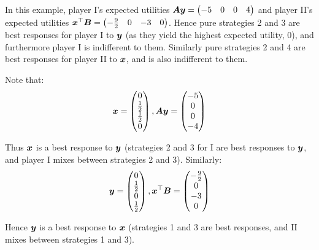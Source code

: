 		In this example, player I's expected utilities $\bm{A} \bm{y}
		= \begin{pmatrix} -5 & 0 & 0 & 4 \end{pmatrix}$ and player II's expected
		utilities $\bm{x}^\top \bm{B} = \begin{pmatrix} -\frac{9}{2} & 0
		& -3 & 0 \end{pmatrix}$. Hence pure strategies 2 and 3
		are best responses for player I to $\bm{y}$ (as they yield the
		highest expected utility, 0), and furthermore player I is indifferent
		to them. Similarly pure strategies 2 and 4 are best responses for
		player II to $\bm{x}$, and is also indifferent to them.

		Note that:
		\begin{equation*}
			\bm{x} =
			\begin{pmatrix}
				0 \\
				\frac{1}{2} \\
				\frac{1}{2} \\
				0
			\end{pmatrix},
			\bm{A} \bm{y} =
			\begin{pmatrix}
				-5 \\
				0 \\
				0 \\
				-4
			\end{pmatrix}
		\end{equation*}

		Thus $\bm{x}$ is a best response to $\bm{y}$ (strategies 2 and 3
		for I are best responses to $\bm{y}$, and player I mixes between
		strategies 2 and 3). Similarly:
		\begin{equation*}
			\bm{y} =
			\begin{pmatrix}
				0 \\
				\frac{1}{2} \\
				0 \\
				\frac{1}{2} \\
			\end{pmatrix},
			\bm{x}^\top \bm{B} = 
			\begin{pmatrix}
				-\frac{9}{2} \\
				0 \\
				-3 \\
				0 \\
			\end{pmatrix}
		\end{equation*}

		Hence $\bm{y}$ is a best response to $\bm{x}$ (strategies 1 and
		3 are best responses, and II mixes between strategies 1 and 3).
